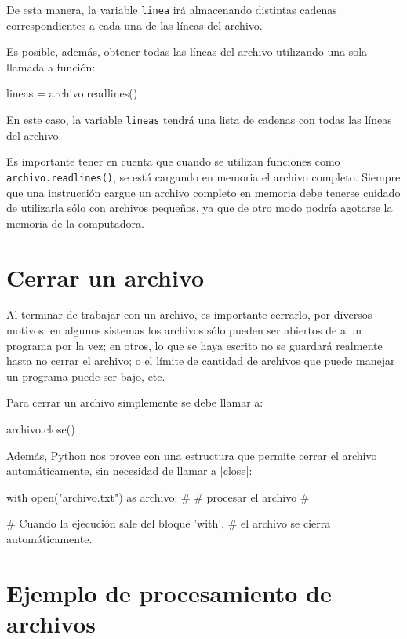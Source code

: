 De esta manera, la variable \lstinline!linea! irá almacenando distintas cadenas
correspondientes a cada una de las líneas del archivo.

Es posible, además, obtener todas las líneas del archivo utilizando una
sola llamada a función:

\begin{codigo-python-sn}
lineas = archivo.readlines()
\end{codigo-python-sn}

En este caso, la variable \lstinline!lineas! tendrá una lista de cadenas con
todas las líneas del archivo.

\begin{atencion}
Es importante tener en cuenta que cuando se utilizan funciones como
\lstinline!archivo.readlines()!, se está cargando en memoria
el archivo completo.  Siempre que una instrucción cargue un archivo
completo en memoria debe tenerse cuidado de utilizarla sólo con archivos
pequeños, ya que de otro modo podría agotarse la memoria de la computadora.
\end{atencion}

\section{Cerrar un archivo}

Al terminar de trabajar con un archivo, es importante cerrarlo,
por diversos motivos: en algunos sistemas los archivos sólo pueden
ser abiertos de a un programa por la vez; en otros, lo que se haya
escrito no se guardará realmente hasta no cerrar el archivo; o el
límite de cantidad de archivos que puede manejar un programa puede
ser bajo, etc.

Para cerrar un archivo simplemente se debe llamar a:

\begin{codigo-python-sn}
archivo.close()
\end{codigo-python-sn}

Además, Python nos provee con una estructura que permite cerrar el archivo
automáticamente, sin necesidad de llamar a |close|:

\begin{codigo-python-sn}
with open("archivo.txt") as archivo:
    #
    # procesar el archivo
    #

# Cuando la ejecución sale del bloque 'with',
# el archivo se cierra automáticamente.
\end{codigo-python-sn}

\section{Ejemplo de procesamiento de archivos}

